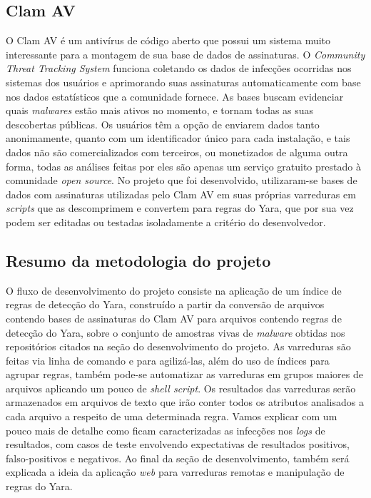 \subsection{Clam AV}
\label{sub:clamav}

O Clam AV é um antivírus de código aberto que possui um sistema muito interessante para a montagem de sua base de dados de assinaturas. O \textit{Community Threat Tracking System} funciona coletando os dados de infecções ocorridas nos sistemas dos usuários e aprimorando suas assinaturas automaticamente com base nos dados estatísticos que a comunidade fornece. As bases buscam evidenciar quais \textit{malwares} estão mais ativos no momento, e tornam todas as suas descobertas públicas. Os usuários têm a opção de enviarem dados tanto anonimamente, quanto com um identificador único para cada instalação, e tais dados não são comercializados com terceiros, ou monetizados de alguma outra forma, todas as análises feitas por eles são apenas um serviço gratuito prestado à comunidade \textit{open source}.
No projeto que foi desenvolvido, utilizaram-se bases de dados com assinaturas utilizadas pelo Clam AV em suas próprias varreduras em \textit{scripts} que as descomprimem e convertem para regras do Yara, que por sua vez podem ser editadas ou testadas isoladamente a critério do desenvolvedor.


\subsection{Resumo da metodologia do projeto}
\label{ss.resumo}

O fluxo de desenvolvimento do projeto consiste na aplicação de um índice de regras de detecção do Yara, construído a partir da conversão de arquivos contendo bases de assinaturas do Clam AV para arquivos contendo regras de detecção do Yara, sobre o conjunto de amostras vivas de \textit{malware} obtidas nos repositórios citados na seção do desenvolvimento do projeto. As varreduras são feitas via linha de comando e para agilizá-las, além do uso de índices para agrupar regras, também pode-se automatizar as varreduras em grupos maiores de arquivos aplicando um pouco de \textit{shell script}. Os resultados das varreduras serão armazenados em arquivos de texto que irão conter todos os atributos analisados a cada arquivo a respeito de uma determinada regra. Vamos explicar com um pouco mais de detalhe como ficam caracterizadas as infecções nos \textit{logs} de resultados, com casos de teste envolvendo expectativas de resultados positivos, falso-positivos e negativos. Ao final da seção de desenvolvimento, também será explicada a ideia da aplicação \textit{web} para varreduras remotas e manipulação de regras do Yara.
